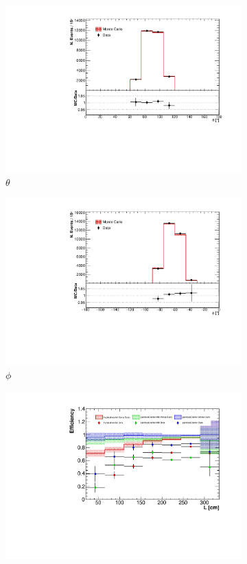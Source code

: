 \documentclass[a4paper]{scrartcl}
\begin{document}
\begin{figure}[htbp]
  \begin{subfigure}{0.33\textwidth}
    \includegraphics[width=\linewidth]{figures/theta.pdf}
    \caption{$\theta$} \label{fig:theta}
  \end{subfigure}\begin{subfigure}{0.33\textwidth}
    \includegraphics[width=\linewidth]{figures/phi.pdf}
    \caption{$\phi$} \label{fig:phi}
  \end{subfigure}\begin{subfigure}{0.33\textwidth}
    \includegraphics[width=\linewidth]{figures/l.pdf}

\end{subfigure}
\end{figure}
\end{document}
